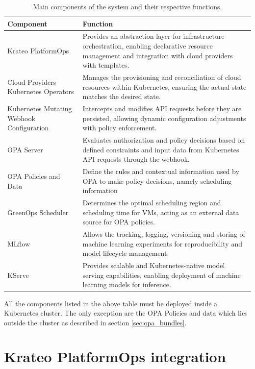 \begin{table}[H]
  \centering
  \renewcommand{\arraystretch}{1.3} %
  \begin{tabularx}{\textwidth}{| l | X |} %
    \hline
    \textbf{Component} & \textbf{Function} \\
    \hline
    Krateo PlatformOps & Provides an abstraction layer for infrastructure orchestration, enabling declarative resource management and integration with cloud providers with templates. \\
    \hline
    Cloud Providers Kubernetes Operators & Manages the provisioning and reconciliation of cloud resources within Kubernetes, ensuring the actual state matches the desired state. \\
    \hline
    Kubernetes Mutating Webhook Configuration & Intercepts and modifies API requests before they are persisted, allowing dynamic configuration adjustments with policy enforcement. \\
    \hline
    OPA Server & Evaluates authorization and policy decisions based on defined constraints and input data from Kubernetes API requests through the webhook. \\
    \hline
    OPA Policies and Data & Define the rules and contextual information used by OPA to make policy decisions, namely scheduling information \\
    \hline
    GreenOps Scheduler & Determines the optimal scheduling region and scheduling time for VMs, acting as an external data source for OPA policies. \\
    \hline
    MLflow & Allows the tracking, logging, versioning and storing of machine learning experiments for reproducibility and model lifecycle management. \\
    \hline
    KServe & Provides scalable and Kubernetes-native model serving capabilities, enabling deployment of machine learning models for inference. \\
    \hline
  \end{tabularx}
  \caption{Main components of the system and their respective functions.}
  \label{tab:system_components}
\end{table}

All the components listed in the above table must be deployed inside a Kubernetes cluster. The only exception are the OPA Policies and data which lies outside the cluster as described in section \ref{sec:opa_bundles}.

\section{Krateo PlatformOps integration}

